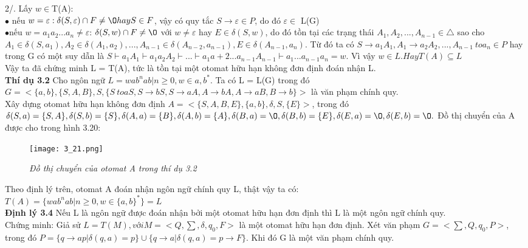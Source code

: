 \begin{flushleft}
2/. Lấy $w \in $T(A):\\
\hspace{10mm}$\bullet$ nếu $w = \varepsilon: \delta(S, \varepsilon) \cap F \ne \O hay S \in F$, vậy có quy tắc $S \to \varepsilon \in P$, do đó $\varepsilon \in$ L(G)\\
\hspace{10mm}$\bullet$nếu $w = a_1a_2...a_n \ne \varepsilon$: $\delta(S, w) \cap F \ne \O$ với $w \ne \varepsilon$ hay $E \in \delta(S, w)$, do đó tồn tại các trạng thái $A_1, A_2, ..., A_{n-1} \in \triangle$ sao cho $A_1 \in \delta(S, a_1), A_2 \in \delta(A_1, a_2),..., A_{n-1} \in \delta(A_{n-2}, a_{n-1}), E \in \delta(A_{n-1}, a_n)$. Từ đó ta có $S \to a_1A_1, A_1 \to a_2A_2,..., A_{n-1}\ to a_n \in P$ hay trong G có một suy dẫn là $S \vdash a_1A_1 \vdash a_1a_2A_2 \vdash ... \vdash a_1a+2...a_{n-1}A_{n-1} \vdash a_1...a_{n-1}a_n = w.$ Vì vậy $w \in L. Hay T(A) \subseteq L$\\
Vậy ta đã chứng minh L = T(A), tức là tồn tại một otomat hữu hạn không đơn định đoán
nhận L.\\
\textbf{Thí dụ 3.2} Cho ngôn ngữ $L = {wab^nab | n \ge 0, w \in {a, b}^*}.$ Ta có L = L(G) trong đó $G = <\{a, b\}, \{S, A, B\}, S, \{S\ to aS, S \to bS, S \to aA, A \to bA, A \to aB, B \to b\}>$ là văn phạm chính quy.\\
Xây dựng otomat hữu hạn không đơn định $A = <\{S, A, B, E\}, \{a, b\}, \delta, S, \{E\}>$, trong đó $\delta(S, a) = \{S, A\}, \delta(S, b) = \{S\}, \delta(A, a) = \{B\}, \delta(A, b) = \{A\}, \delta(B, a) = \O, \delta(B, b) = \{E\}, \delta(E, a) = \O, \delta(E, b) = \O.$ Đồ thị chuyển của A được cho trong hình 3.20:\\
\begin{figure}[ht]
\texttt{[image: 3\_21.png]}
\caption{ \textit{Đồ thị chuyển của otomat A trong thí dụ 3.2}}
\end{figure}
Theo định lý trên, otomat A đoán nhận ngôn ngữ chính quy L, thật vậy ta có:\\
$T(A) = \{wab^nab | n \ge 0, w \in \{a, b\}^*\} = L$\\
\textbf{Định lý 3.4} Nếu L là ngôn ngữ được đoán nhận bởi một otomat hữu hạn đơn định thì L là một ngôn ngữ chính quy.\\
Chứng minh: Giả sử $L = T(M), với M = <Q, \sum, \delta, q_0, F>$ là một otomat hữu hạn đơn định. Xét
văn phạm $G = <\sum, Q, q_0, P>$, trong đó $P = \{q \to ap | \delta(q, a) = p\} \cup \{q \to a | \delta(q, a) = p \to F\}$. Khi
đó G là một văn phạm chính quy.\\

\end{flushleft}
